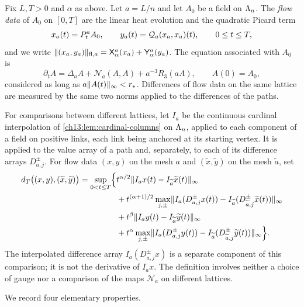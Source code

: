 \begin{definition}\label{ch21:def:two-grade-datum}
Fix $L,T>0$ and $\alpha$ as above. Let $a=L/n$ and let $A_0$ be a field on $\Lambda_{n}$. The \emph{flow data} of $A_0$ on $[0,T]$ are the linear heat evolution and the quadratic Picard term
\[
 x_a(t)=P^a_tA_0,\qquad y_a(t)=\mathcal Q_{a}(x_a,x_a)(t),\qquad 0\le t\le T,
\]
and we write $\lVert (x_a,y_a)\rVert_{\mathrm{fl},a}=\mathsf X_{\alpha}^{a}(x_a)+\mathsf Y_{\alpha}^{a}(y_a)$. The equation associated with $A_0$ is
\begin{equation}\label{ch21:eq:full-equation}
 \partial_tA=\Delta_aA+\mathcal N_a(A,A)+a^{-3}R_3(aA),\qquad A(0)=A_0,
\end{equation}
considered as long as $a\lVert A(t)\rVert_\infty<r_*$. Differences of flow data on the same lattice are measured by the same two norms applied to the differences of the paths.

For comparisons between different lattices, let $I_a$ be the continuous cardinal interpolation of \cref{ch13:lem:cardinal-columns} on $\Lambda_{n}$, applied to each component of a field on positive links, each link being anchored at its starting vertex. It is applied to the value array of a path and, separately, to each of its difference arrays $D^{\pm}_{a,j}$. For flow data $(x,y)$ on the mesh $a$ and $(\widetilde x,\widetilde y)$ on the mesh $\widetilde a$, set
\begin{equation}\label{ch21:eq:comparison-metric}
 \begin{split}
 d_T\bigl((x,y),(\widetilde x,\widetilde y)\bigr)=\sup_{0<t\le T}\Bigl\{&t^{\alpha/2}\lVert I_ax(t)-I_{\widetilde a}\widetilde x(t)\rVert_\infty\\
 &+t^{(\alpha+1)/2}\max_{j,\pm}\lVert I_a(D^{\pm}_{a,j}x(t))-I_{\widetilde a}(D^{\pm}_{\widetilde a,j}\widetilde x(t))\rVert_\infty\\
 &+t^{\beta}\lVert I_ay(t)-I_{\widetilde a}\widetilde y(t)\rVert_\infty\\
 &+t^{\alpha}\max_{j,\pm}\lVert I_a(D^{\pm}_{a,j}y(t))-I_{\widetilde a}(D^{\pm}_{\widetilde a,j}\widetilde y(t))\rVert_\infty\Bigr\}.
 \end{split}
\end{equation}
The interpolated difference array $I_a(D^{\pm}_{a,j}x)$ is a separate component of this comparison; it is not the derivative of $I_ax$. The definition involves neither a choice of gauge nor a comparison of the maps $\mathcal N_a$ on different lattices.
\end{definition}

We record four elementary properties.

